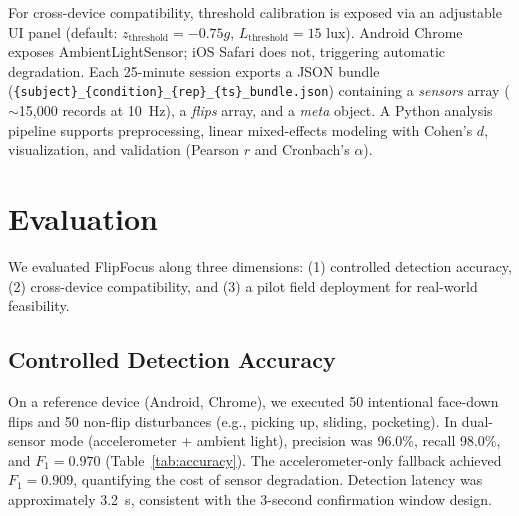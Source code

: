 \documentclass[sigconf]{acmart}
\begin{document}
\begin{table}[htbp]
  \centering
  \caption{Sensor fusion modes and degradation paths.}
  \label{tab:fusion}
\end{table}

For cross-device compatibility, threshold calibration is exposed via an adjustable UI panel (default: $z_{\text{threshold}} = -0.75g$, $L_{\text{threshold}} = 15$ lux). Android Chrome exposes AmbientLightSensor; iOS Safari does not, triggering automatic degradation. Each 25-minute session exports a JSON bundle (\nolinkurl{{subject}_{condition}_{rep}_{ts}_bundle.json}) containing a \textit{sensors} array ($\sim$15,000 records at 10~Hz), a \textit{flips} array, and a \textit{meta} object. A Python analysis pipeline supports preprocessing, linear mixed-effects modeling with Cohen's $d$, visualization, and validation (Pearson $r$ and Cronbach's $\alpha$).

\section{Evaluation}

We evaluated FlipFocus along three dimensions: (1) controlled detection accuracy, (2) cross-device compatibility, and (3) a pilot field deployment for real-world feasibility.

\subsection{Controlled Detection Accuracy}

On a reference device (Android, Chrome), we executed 50 intentional face-down flips and 50 non-flip disturbances (e.g., picking up, sliding, pocketing). In dual-sensor mode (accelerometer + ambient light), precision was 96.0\%, recall 98.0\%, and $F_1=0.970$ (Table~\ref{tab:accuracy}). The accelerometer-only fallback achieved $F_1=0.909$, quantifying the cost of sensor degradation. Detection latency was approximately 3.2~s, consistent with the 3-second confirmation window design.
\end{document}
